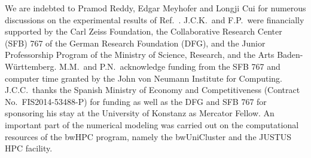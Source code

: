 \documentclass[aps,amsmath,amssymb,twocolumn,showpacs]{revtex4-1}
\begin{document}
We are indebted to Pramod Reddy, Edgar Meyhofer and Longji Cui for numerous
discussions on the experimental results of Ref.~.
J.C.K.\ and F.P.\ were financially supported by the Carl Zeiss Foundation, the
Collaborative Research Center (SFB) 767 of the German Research Foundation
(DFG), and the Junior Professorship Program of the Ministry of Science,
Research, and the Arts Baden-W\"urttemberg.  M.M.\ and P.N.\ acknowledge
funding from the SFB 767 and computer time granted by the John von Neumann
Institute for Computing. J.C.C.\ thanks the Spanish Ministry of Economy and
Competitiveness (Contract No.\ FIS2014-53488-P) for funding as well as the DFG
and SFB 767 for sponsoring his stay at the University of Konstanz as Mercator
Fellow. An important part of the numerical modeling was carried out on the
computational resources of the bwHPC program, namely the bwUniCluster and the
JUSTUS HPC facility.
\end{document}
